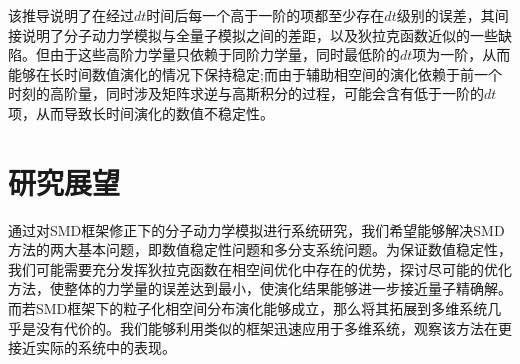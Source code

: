 该推导说明了在经过$dt$时间后每一个高于一阶的项都至少存在$dt$级别的误差，其间接说明了分子动力学模拟与全量子模拟之间的差距，以及狄拉克函数近似的一些缺陷。但由于这些高阶力学量只依赖于同阶力学量，同时最低阶的$dt$项为一阶，从而能够在长时间数值演化的情况下保持稳定;而由于辅助相空间的演化依赖于前一个时刻的高阶量，同时涉及矩阵求逆与高斯积分的过程，可能会含有低于一阶的$dt$项，从而导致长时间演化的数值不稳定性。

\section{研究展望}
通过对SMD框架修正下的分子动力学模拟进行系统研究，我们希望能够解决SMD方法的两大基本问题，即数值稳定性问题和多分支系统问题。为保证数值稳定性，我们可能需要充分发挥狄拉克函数在相空间优化中存在的优势，探讨尽可能的优化方法，使整体的力学量的误差达到最小，使演化结果能够进一步接近量子精确解。而若SMD框架下的粒子化相空间分布演化能够成立，那么将其拓展到多维系统几乎是没有代价的。我们能够利用类似的框架迅速应用于多维系统，观察该方法在更接近实际的系统中的表现。
\newpage
{\songti\printbibliography[title={参考文献}]}
